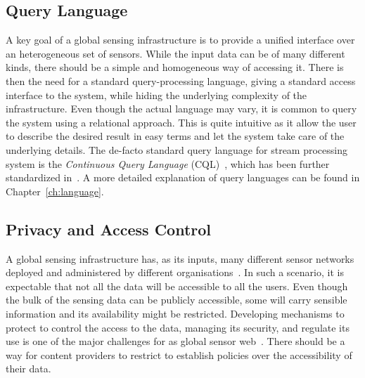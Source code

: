 
\subsection{Query Language}
A key goal of a global sensing infrastructure is to provide a unified interface over an heterogeneous set of sensors.
While the input data can be of many different kinds, there should be a simple and homogeneous way of accessing it.
There is then the need for a standard query-processing language, giving a standard access interface to the system, while
hiding the underlying complexity of the infrastructure. Even though the actual language may vary, it is common to query the
system using a relational approach. This is quite intuitive as it allow the user to describe the desired result in easy
terms and let the system take care of the underlying details. The de-facto standard query language for stream
processing system is the \textit{Continuous Query Language} (CQL)~\cite{cql}, which has been further standardized in~\cite{streamsql}.
A more detailed explanation of query languages can be found in Chapter~\ref{ch:language}.

\subsection{Privacy and Access Control}
A global sensing infrastructure has, as its inputs, many different sensor networks deployed and administered by different
organisations~\cite{irisnet, stream-processing-challanges}. In such a scenario, it is expectable that not all the data
will be accessible to all the users. Even
though the bulk of the sensing data can be publicly accessible, some will carry sensible information and its
availability might be restricted. Developing mechanisms to protect to control the access to the data, managing its
security, and regulate its use is one of the major challenges for as global sensor web~\cite{sn-security}. There should be a way for
content providers to restrict to establish policies over the accessibility of their data. 

